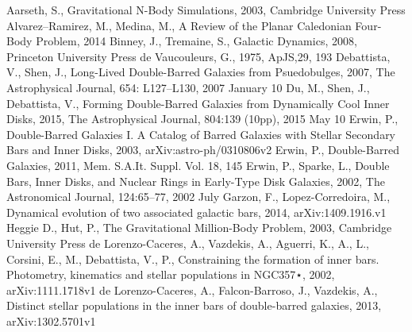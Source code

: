 \documentclass[a4paper,12pt]{article}
\begin{document}

\newpage
\begin{thebibliography}{1}
Aarseth, S., Gravitational N-Body Simulations, 2003, Cambridge University Press
Alvarez–Ramirez, M., Medina, M., A Review of the Planar Caledonian Four-Body Problem, 2014
Binney, J., Tremaine, S., Galactic Dynamics, 2008, Princeton University Press
de Vaucouleurs, G., 1975, ApJS,29, 193
Debattista, V., Shen, J., Long-Lived Double-Barred Galaxies from Psuedobulges, 2007, The Astrophysical Journal, 654: L127–L130, 2007 January 10
Du, M., Shen, J., Debattista, V., Forming Double-Barred Galaxies from Dynamically Cool Inner Disks, 2015, The Astrophysical Journal, 804:139 (10pp), 2015 May 10 
Erwin, P., Double-Barred Galaxies I. A Catalog of Barred Galaxies with Stellar Secondary Bars and Inner Disks, 2003, arXiv:astro-ph/0310806v2
Erwin, P., Double-Barred Galaxies, 2011, Mem. S.A.It. Suppl. Vol. 18, 145
Erwin, P., Sparke, L., Double Bars, Inner Disks, and Nuclear Rings in Early-Type Disk Galaxies, 2002, The Astronomical Journal, 124:65–77, 2002 July
Garzon, F., Lopez-Corredoira, M., Dynamical evolution of two associated galactic bars, 2014, arXiv:1409.1916.v1
Heggie D., Hut, P., The Gravitational Million-Body Problem, 2003, Cambridge University Press
de Lorenzo-Caceres, A., Vazdekis, A., Aguerri, K., A., L., Corsini, E., M., Debattista, V., P., Constraining the formation of inner bars. Photometry, kinematics and stellar populations in NGC357⋆, 2002, arXiv:1111.1718v1
de Lorenzo-Caceres, A., Falcon-Barroso, J., Vazdekis, A., Distinct stellar populations in the inner bars of double-barred galaxies, 2013, arXiv:1302.5701v1

\end{thebibliography}
\end{document}
